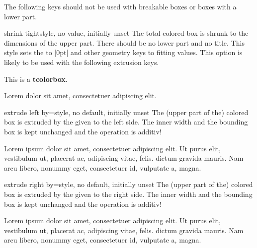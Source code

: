 \clearpage
\begin{marker}
The following keys should not be used with breakable boxes or boxes with a
lower part.
\end{marker}

\begin{docTcbKey}{shrink tight}{}{style, no value, initially unset}
  The total colored box is shrunk to the dimensions of the upper
  part. There should be no lower part and no title.
  This style sets the  to |0pt| and other geometry keys
  to fitting values. This option is likely to be used with the following
  extrusion keys.
\begin{dispExample}

\begin{tcolorbox}
This is a \textbf{tcolorbox}.
\end{tcolorbox}

Lorem  dolor sit amet, consectetuer adipiscing elit.
\end{dispExample}
\end{docTcbKey}

\begin{docTcbKey}[][doc updated=2014-09-19]{extrude left by}{=}{style, no default, initially unset}
  The (upper part of the) colored box is extruded by the given  to the left side.
  The inner width and the bounding box is kept unchanged and the operation
  is additiv!
\begin{dispExample}

Lorem ipsum dolor sit amet, consectetuer adipiscing elit. Ut purus elit,
vestibulum ut, placerat ac, adipiscing vitae, felis.
 dictum gravida mauris.
Nam arcu libero, nonummy eget, consectetuer id, vulputate a, magna.
\end{dispExample}
\end{docTcbKey}

\begin{docTcbKey}[][doc updated=2014-09-19]{extrude right by}{=}{style, no default, initially unset}
  The (upper part of the) colored box is extruded by the given  to the right side.
  The inner width and the bounding box is kept unchanged and the operation
  is additiv!
\begin{dispExample}

Lorem ipsum dolor sit amet, consectetuer adipiscing elit. Ut purus elit,
vestibulum ut, placerat ac, adipiscing vitae, felis.
 dictum gravida mauris.
Nam arcu libero, nonummy eget, consectetuer id, vulputate a, magna.
\end{dispExample}
\end{docTcbKey}

